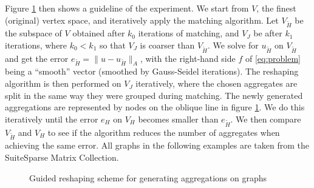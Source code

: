 \documentclass[ ]{elsarticle}
\newcommand{\vsp}{V}
\numberwithin{equation}{section}
\newcommand{\red}[1]{#1}
\begin{document}
Figure \ref{fig:reshaping-scheme} then shows a guideline of the
experiment. We start from $V$, the finest (original) vertex space, and
iteratively apply the matching algorithm. Let $\vsp_{\widetilde{H}}$
be the subspace of $\vsp$ obtained after $k_0$ iterations of matching,
and $\vsp_J$ be after $k_1$ iterations, where $k_0<k_1$ so that
$\vsp_J$ is coarser than $\vsp_{\widetilde{H}}$. We solve for
$u_{\widetilde{H}}$ on $\vsp_{\widetilde{H}}$ and get the error
$e_{\widetilde{H}} = \|u-u_{\widetilde{H}}\|_A$, with the right-hand
side $f$ of \eqref{eq:problem} being a ``smooth'' vector (smoothed by
Gauss-Seidel iterations). The reshaping algorithm is then performed on
$\vsp_J$ iteratively, where the chosen aggregates are split in the
same way they were grouped during matching. The newly generated
aggregations are represented by nodes on the oblique line in figure
\ref{fig:reshaping-scheme}. We do this iteratively until the error
$e_H$ on $\vsp_H$ becomes smaller than $e_{\widetilde{H}}$. We then
compare $\vsp_{\widetilde{H}}$ and $\vsp_H$ to see if the algorithm
reduces the number of aggregates when achieving the same
error. \red{All graphs in the following examples are taken from the
  SuiteSparse Matrix Collection.}

\begin{figure}
  \centering
  \caption{Guided reshaping scheme for generating aggregations on
    graphs}
  \label{fig:reshaping-scheme}
\end{figure}
\end{document}
